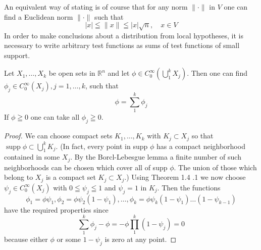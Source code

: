 An equivalent way of stating  is of course that for any norm $\|\cdot \|$ in $V$ one can find a Euclidean norm $\|\cdot\|$ such that
\[
	|x| \leqq\|x\| \leqq|x| \sqrt{n}, \quad x \in V
\]
In order to make conclusions about a distribution from local hypotheses, it is necessary to write arbitrary test functions as sums of test functions of small support.
\begin{theorem}
    Let $X_{1}, \ldots, X_{k}$ be open sets in $\mathbb{R}^{n}$ and let $\phi \in C_{0}^{\infty}\left(\bigcup_{1}^{k} X_{j}\right)$. Then one can find $\phi_{j} \in C_{0}^{\infty}\left(X_{j}\right), j=1, \ldots, k$, such that
\begin{equation}
    \label{(1.4.4)}
	\phi=\sum_{1}^{k} \phi_{j}
\end{equation}
If $\phi \geqq 0$ one can take all $\phi_{j} \geqq 0$.
\end{theorem}
\begin{proof}
    We can choose compact sets $K_{1}, \ldots, K_{k}$ with $K_{j} \subset X_{j}$ so that $\operatorname{supp} \phi \subset \bigcup_{1}^{k} K_{j}$. (In fact, every point in supp $\phi$ has a compact neighborhood contained in some $X_{j}$. By the Borcl-Lebesgue lemma a finite number of such neighborhoods can be chosen which cover all of supp $\phi$. The union of those which belong to $X_{j}$ is a compact set $K_{j}\subset X_{j}$.) Using Theorem 1.4 .1 we now choose $\psi_{j} \in C_{0}^{\infty}\left(X_{j}\right)$ with $0 \leqq \psi_{j} \leqq 1$ and $\psi_{j}=1$ in $K_{j}$. Then the functions
\[
	\phi_{1}=\phi \psi_{1}, \phi_{2}=\phi \psi_{2}\left(1-\psi_{1}\right), \ldots, \phi_{k}=\phi \psi_{k}\left(1-\psi_{1}\right) \ldots\left(1-\psi_{k-1}\right)
\]
have the required properties since
\[
	\sum_{1}^{k} \phi_{j}-\phi=-\phi \prod_{1}^{k}\left(1-\psi_{j}\right)=0
\]
because either $\phi$ or some $1-\psi_{j}$ is zero at any point.
\end{proof}

